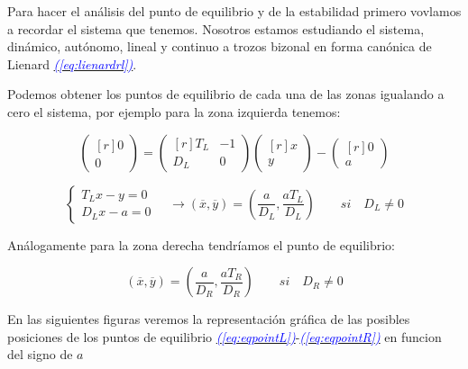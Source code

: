 \documentclass[12pt,a4paper]{report} %
\newcommand{\eref}[1]{\hyperref[#1]{\textcolor{blue}{\textit{(\ref*{#1})}}}}
\begin{document}
		\vspace{0.5cm}Para hacer el análisis del punto de equilibrio y de la estabilidad primero vovlamos a recordar el sistema que tenemos. Nosotros estamos estudiando el sistema, dinámico, autónomo, lineal y continuo a trozos bizonal en forma canónica de Lienard \eref{eq:lienardrl}.
		
		\vspace{0.5cm}Podemos obtener los puntos de equilibrio de cada una de las zonas igualando a cero el sistema, por ejemplo para la zona izquierda tenemos:

		
		\begin{equation*}
			\begin{pmatrix*}[r]
				0\\ 0
			\end{pmatrix*}= \begin{pmatrix*}[r]
				T_L & -1 \\ D_L & 0
			\end{pmatrix*} \begin{pmatrix*}[r]
				x \\ y
			\end{pmatrix*}-\begin{pmatrix*}[r]
				0 \\ a
			\end{pmatrix*}
		\end{equation*}\smallskip
		
		\begin{equation}
			\label{eq:eqpointL}
			\left\{
			\begin{aligned}
				T_Lx-y=0\\
				D_Lx-a=0
			\end{aligned}
			\right. \quad \longrightarrow \left( \overline{x},\overline{y} \right)=\left( \frac{a}{D_L},\frac{aT_L}{D_L} \right) \qquad si \quad D_L\neq0
		\end{equation}\smallskip
		
		Análogamente para la zona derecha tendríamos el punto de equilibrio:
		
		\begin{equation}
			\label{eq:eqpointR}
			\left( \overline{x},\overline{y} \right)=\left( \frac{a}{D_R},\frac{aT_R}{D_R} \right) \qquad si \quad D_R\neq0
		\end{equation}\smallskip
		
	 	
		
		\newpage
		
		\vspace{0.5cm} En las siguientes figuras veremos la representación gráfica de las posibles posiciones de los puntos de equilibrio \eref{eq:eqpointL}-\eref{eq:eqpointR} en funcion del signo de $a$
		
\end{document}
